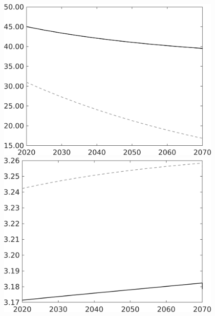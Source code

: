 \documentclass[12pt]{article}
\begin{document}
\begin{figure}
\begin{minipage}[]{0.32\textwidth}
	\end{minipage}
	\begin{minipage}[]{0.32\textwidth}
		\includegraphics[width=1\textwidth]{../../codding_model/own_basedOnFried/optimalPol_010922_revision/figures/all_13Sept22/LevTaufNoTauf_TaulCalib_regime0_gAg_spillover0_nsk0_xgr0_knspil1_sep1_LFlimit0_emsbase0_countec0_GovRev0_etaa0.79_lgd0.png}
	\end{minipage}
	\begin{minipage}[]{0.32\textwidth}
		\includegraphics[width=1\textwidth]{../../codding_model/own_basedOnFried/optimalPol_010922_revision/figures/all_13Sept22/LevTaufNoTauf_TaulCalib_regime0_gAn_spillover0_nsk0_xgr0_knspil1_sep1_LFlimit0_emsbase0_countec0_GovRev0_etaa0.79_lgd0.png}

\end{minipage}
\end{figure}
\end{document}
